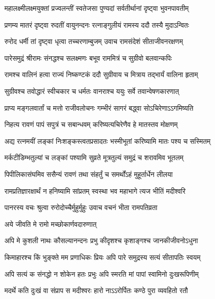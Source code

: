\twolineshloka
{महालक्ष्मीलक्ष्मयुक्तां प्रज्वलन्तीं स्वतेजसा}
{पुण्यदां सर्वतीर्थानां दृष्ट्वा भुवनपावतीम्}%


\twolineshloka
{प्रणम्य मातरं दृष्ट्वा रुदतीं वायुनन्दनः}
{रत्नाङ्गुलीयं रामस्य ददौ तस्यै मुदाऽन्वितः}%


\twolineshloka
{रुरोद धर्मी तां दृष्ट्वा धृत्वा तच्चरणाम्बुजम्}
{उवाच रामसंदेशं सीताजीवनरक्षणम्}%


\twolineshloka
{पारेसमुद्रं श्रीरामः संनद्धश्च सलक्ष्मणः}
{बभूव राममित्रं च सुग्रीवो बलवान्कपिः}%


\twolineshloka
{रामश्च वालिनं हत्वा राज्यं निष्कण्टकं ददौ}
{सुग्रीवाय च मित्राय तद्भार्यं वालिना हृताम्}%


\twolineshloka
{सुग्रीवश्च तवोद्धारं स्वीचकार च धर्मतः}
{वानराश्च ययुः सर्वे तवान्वेषणकारणात्}%


\twolineshloka
{प्राप्य मङ्गलवार्तां च मत्तो राजीवलोचनः}
{गम्भीरं सागरं बद्ध्वा सोऽचिरेणाऽऽगमिष्यति}%


\twolineshloka
{निहत्य रावणं पापं सपुत्रं च सबान्धवम्}
{करिष्यत्यचिरेणैव हे मातस्तव मोक्षणम्}%


\twolineshloka
{अद्य रत्नमयीं लङ्कां निःशङ्कस्त्वतप्रसादतः}
{भस्मीभूतां करिष्यामि मातः पश्य च सस्मितम्}%


\twolineshloka
{मर्कटीडिम्भतुल्यां च लङ्कां पश्यामि सुव्रते}
{मूत्रतुल्यं समुद्रं च शरावमिव भूतलम्}%


\twolineshloka
{पिपीलिकासंघमिव ससैन्यं रावणं तथा}
{संहर्तुं च समर्थोंऽहं मुहूर्तार्धेन लीलया}%


\twolineshloka
{रामप्रतिज्ञारक्षार्थं न हनिष्यामि सांप्रतम्}
{स्वस्था भव महाभागे त्यज भीतिं मदीश्वरि}%


\twolineshloka
{पानरस्य वचः श्रुत्वा रुरोदोच्चैर्मुहुर्मुहुः}
{उवाच वचनं भीता रामपतिव्रता}%


\onelineshloka
{अये जीवति मे रामो मच्छोकार्णवदारुणात्}%


\twolineshloka
{अपि मे कुशली नाथः कौसल्यानन्दनः प्रभु}
{कीदृशश्च कृशाङ्गश्च जानकीजीवनोऽधुना}%


\twolineshloka
{किमाहारश्च किं भुङ्क्ते मम प्रणाधिकः प्रियः}
{अपि पारे समुद्रस्य सत्यं सीतापतिः स्वयम्}%


\twolineshloka
{अपि सत्यं क संनद्धो न शोकेन हतः प्रभुः}
{अपि स्मरति मां पापां स्वामिनो दुःखरूपिणीम्}%


\twolineshloka
{मदर्थे कति दुःखं वा संप्राप स मदीश्वरः}
{हारो नाऽऽरोर्पितः कण्ठे पुरा व्यवहितो रतौ}%


